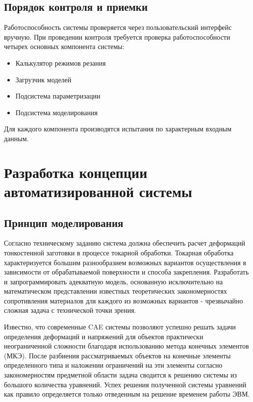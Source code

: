 \documentclass[14pt,oneside,final]{extreport}
\begin{document}
	\section{Порядок контроля и приемки}
	Работоспособность системы проверяется через пользовательский интерфейс вручную.	При проведении контроля требуется проверка работоспособности четырех основных компонента системы: 
	\begin{itemize}
		\item Калькулятор режимов резания 
		\item Загрузчик моделей 
		\item Подсистема параметризации
		\item Подсистема моделирования
	\end{itemize}
	Для каждого компонента производятся испытания по характерным входным данным. 


	\chapter{Разработка концепции автоматизированной системы}
	\section{Принцип моделирования}
	Согласно техническому заданию система должна обеспечить расчет деформаций тонкостенной заготовки в процессе токарной обработки. Токарная обработка характеризуется большим разнообразием возможных вариантов осуществления в зависимости от обрабатываемой поверхности и способа закрепления. Разработать и запрограммировать адекватную модель, основанную исключительно на математическом представлении известных теоретических закономерностях сопротивления материалов для каждого из возможных вариантов - чрезвычайно сложная задача с технической точки зрения. 
	
	Известно, что современные CAE системы позволяют успешно решать задачи определения деформаций и напряжений для объектов практически неограниченной сложности благодаря использованию метода конечных элементов (МКЭ). После разбиения рассматриваемых объектов на конечные элементы определенного типа и наложении ограничений на эти элементы согласно закономерностям предметной области задача сводится к решению системы из большого количества уравнений. Успех решения полученной системы уравнений как правило определяется только отведенным на решение временем работы ЭВМ. 
	
\end{document}
